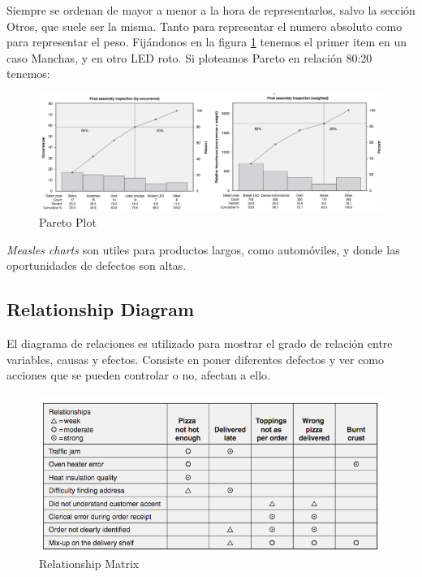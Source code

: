 \documentclass[]{article}
\begin{document}
Siempre se ordenan de mayor a menor a la hora de representarlos, salvo la sección Otros, que suele ser la misma. Tanto para representar el numero absoluto como para representar el peso. Fijándonos en la figura \ref{fig:ParetoPlot} tenemos el primer item en un caso Manchas, y en otro LED roto. 
Si ploteamos Pareto en relación 80:20 tenemos:

\begin{figure}[ht!]
	\centering
	\includegraphics[width=180mm]{imagenes/ParetoPlot.png}
	\caption{Pareto Plot}
	\label{fig:ParetoPlot}
\end{figure}

\textit{Measles charts} son utiles para productos largos, como automóviles, y donde las oportunidades de defectos son altas.

\subsection{Relationship Diagram}

El diagrama de relaciones es utilizado para mostrar el grado de relación entre variables, causas y efectos. Consiste en poner diferentes defectos y ver como acciones que se pueden controlar o no, afectan a ello.

\begin{figure}[ht!]
	\centering
	\includegraphics[width=120mm]{imagenes/RelationshipMatrix.png}
	\caption{Relationship Matrix}
	\label{fig:RelationshipMatrix}
\end{figure}
\end{document}
